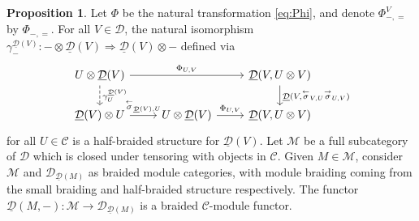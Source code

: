 \documentclass[12pt,dvipsnames]{article}
\numberwithin{equation}{section}
\theoremstyle{definition}
\newtheorem{proposition}[definition]{Proposition}
\newcommand{\cat}[1]{\mathcal{#1}}
\newcommand{\1}{\ensuremath{\mathbbm{1}}}
\newcommand{\lc}{\ensuremath{\overset{\rightarrow}{\sigma}}}
\newcommand{\rc}{\ensuremath{\overset{\leftarrow}{\sigma}}}
\newcommand{\blank}{{-}}
\newcommand{\bblank}{{=}}
\begin{document}
\begin{proposition}\label{prop:HalfBraidingClosed}
    Let $\Phi$ be the natural transformation \eqref{eq:Phi}, and denote $\Phi^V_{\blank,\bblank}$ by $\Phi_{\blank,\bblank}$. For all $V\in\cat{D}$, the natural isomorphism $\gamma^{\underline{\cat{D}}(V)}_\blank:\blank\otimes\underline{\cat{D}}(V) \Rightarrow \underline{\cat{D}}(V)\otimes\blank$ 
    defined via
    \begin{equation}\label{eq:InHomHB}
        \begin{tikzcd}
            U\otimes\underline{\cat{D}}(V) && \underline{\cat{D}}(V,U\otimes V) \\
            \underline{\cat{D}}(V) \otimes U & U\otimes \underline{\cat{D}}(V) & \underline{\cat{D}}(V,U\otimes V)
            \arrow["{\Phi_{U,V}}", from=1-1, to=1-3]\arrow["{\underline{\cat{D}}(V,\rc_{V,U}\lc_{U,V})}", from=1-3, to=2-3]\arrow["{\Phi_{U,V}}", from=2-2, to=2-3]\arrow["{\rc_{\underline{\cat{D}}(V),U}}", from=2-1, to=2-2]
            \arrow[dashed, "{\gamma^{\underline{\cat{D}}(V)}_U}", from=1-1, to=2-1]
        \end{tikzcd}
    \end{equation}
    for all $U\in\cat{C}$ is a half-braided structure for $\underline{\cat{D}}(V)$. Let $\cat{M}$ be a full subcategory of $\cat{D}$ which is closed under tensoring with objects in $\cat{C}$. Given $M\in\cat{M}$, consider $\cat{M}$ and $\cat{D}_{\underline{\cat{D}}(M)}$ as braided module categories, with module braiding coming from  the small braiding and half-braided structure respectively. The functor $\underline{\cat{D}}(M,\blank):\cat{M}\to\cat{D}_{\underline{\cat{D}}(M)}$ is a braided $\cat{C}$-module functor.
\end{proposition}
\end{document}
